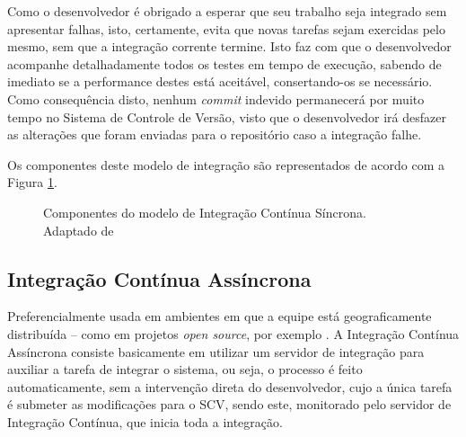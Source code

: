 Como o desenvolvedor é obrigado a esperar que seu trabalho seja integrado sem apresentar falhas, isto, certamente, evita que novas tarefas sejam exercidas pelo mesmo, sem que a integração corrente termine. Isto faz com que o desenvolvedor acompanhe detalhadamente todos os testes em tempo de execução, sabendo de imediato se a performance destes está aceitável, consertando-os se necessário. Como consequência disto, nenhum \textit{commit} indevido permanecerá por muito tempo no Sistema de Controle de Versão, visto que o desenvolvedor irá desfazer as alterações que foram enviadas para o repositório caso a integração falhe.

Os componentes deste modelo de integração são representados de acordo com a Figura \ref{componentes_sincrono}.

\begin{figure}[ht]
    \centering
    \caption{Componentes do modelo de Integração Contínua Síncrona. Adaptado de \cite{DUVALL}}
    \label{componentes_sincrono}
\end{figure}

\subsection{Integração Contínua Assíncrona}

Preferencialmente usada em ambientes em que a equipe está geograficamente distribuída – como em projetos \textit{open source}, por exemplo \cite{IMPROVEIT-INTEGRACAO}. A Integração Contínua Assíncrona consiste basicamente em utilizar um servidor de integração para auxiliar a tarefa de integrar o sistema, ou seja, o processo é feito automaticamente, sem a intervenção direta do desenvolvedor, cujo a única tarefa é submeter as modificações para o SCV, sendo este, monitorado pelo servidor de Integração Contínua, que inicia toda a integração.

